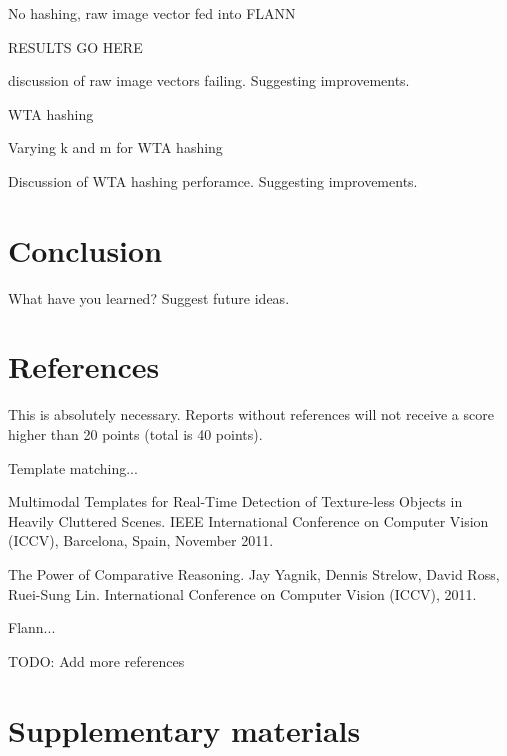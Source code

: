\documentclass[10pt,twocolumn,letterpaper]{article}
\begin{document}
No hashing, raw image vector fed into FLANN

RESULTS GO HERE

discussion of raw image vectors failing. Suggesting improvements.

WTA hashing 

Varying k and m for WTA hashing

Discussion of WTA hashing perforamce. Suggesting improvements.

\section{Conclusion}

What have you learned? Suggest future ideas.

\section{References}

This is absolutely necessary. Reports without references will not receive a score higher than 20 points (total is 40 points).

Template matching...

Multimodal Templates for Real-Time Detection of Texture-less Objects in Heavily Cluttered Scenes. IEEE International Conference on Computer Vision (ICCV), Barcelona, Spain, November 2011.

The Power of Comparative Reasoning. Jay Yagnik, Dennis Strelow, David Ross, Ruei-Sung Lin. International Conference on Computer Vision (ICCV), 2011.

Flann...


TODO: Add more references

\section{Supplementary materials}
\end{document}
